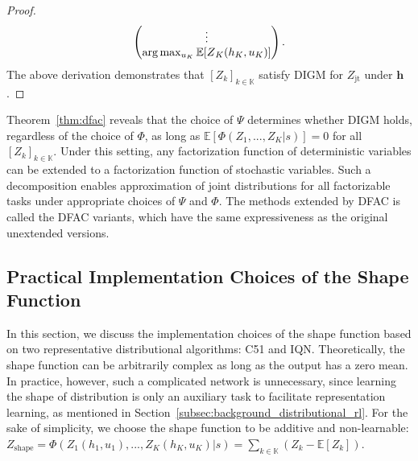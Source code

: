 \documentclass[twoside,11pt]{article}
\newcommand{\state}{s}
\newcommand{\action}{u}
\newcommand{\jointobservationhistory}{\mathbf{h}}
\newcommand{\observationhistory}{h}
\newcommand{\agentspace}{\mathbb{K}}
\newcommand{\agentcounter}{k}
\newcommand{\numberofagents}{K}
\newcommand{\utility}{Z}
\newcommand{\joint}{\mathrm{jt}}
\newcommand{\meandecompositionfunction}{\Psi}
\newcommand{\shapedecompositionfunction}{\Phi}
\newcommand{\digm}{DIGM}
\begin{document}
\begin{proof}
\begin{equation}
\begin{aligned}
\begin{pmatrix}
\vdots \\
\arg\max_{\action{}_\numberofagents{}} \mathbb{E}[\utility{}_\numberofagents{}(\observationhistory{}_\numberofagents{},\action{}_\numberofagents{})]
\end{pmatrix}.\\
\end{aligned}
\notag{}
\end{equation}
The above derivation demonstrates that $[\utility{}_\agentcounter{}]_{\agentcounter{}\in\agentspace{}}$ satisfy \digm{} for $\utility{}_{\joint{}}$ under $\jointobservationhistory{}$.
\end{proof} Theorem~\ref{thm:dfac} reveals that the choice of $\meandecompositionfunction$ determines whether DIGM holds, regardless of the choice of $\shapedecompositionfunction$, as long as $\mathbb{E}[\shapedecompositionfunction{}(\utility_1,...,\utility_{\numberofagents{}}\vert\state)]=0$ for all $[\utility{}_\agentcounter{}]_{\agentcounter{}\in\agentspace{}}$. Under this setting, any factorization function of deterministic variables can be extended to a factorization function of stochastic variables. Such a decomposition enables approximation of joint distributions for all factorizable tasks under appropriate choices of $\meandecompositionfunction{}$ and $\shapedecompositionfunction{}$. The methods extended by DFAC is called the DFAC variants, which have the same expressiveness as the original unextended versions.



\subsection{Practical Implementation Choices of the Shape Function}
\label{subsec:methodology_a_practical_implementation_of_dfac}

In this section, we discuss the implementation choices of the shape function based on two representative distributional algorithms: C51 and IQN. Theoretically, the shape function can be arbitrarily complex as long as the output has a zero mean. In practice, however, such a complicated network is unnecessary, since learning the shape of distribution is only an auxiliary task to facilitate representation learning, as mentioned in Section~\ref{subsec:background_distributional_rl}. For the sake of simplicity, we choose the shape function to be additive and non-learnable: $Z_\mathrm{shape}=\shapedecompositionfunction(\utility{}_1(\observationhistory{}_1,\action{}_1), ..., \utility{}_{\numberofagents{}}(\observationhistory{}_{\numberofagents{}},\action{}_{\numberofagents{}})\vert\state)=\sum_{\agentcounter\in\agentspace}(Z_\agentcounter-\mathbb{E}[Z_\agentcounter])$.
\end{document}

